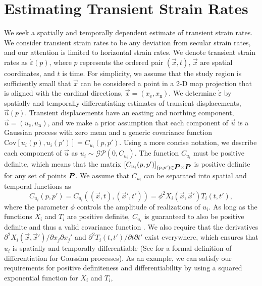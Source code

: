 \documentclass[extra,mreferee]{gji}
\begin{document}
\section{Estimating Transient Strain Rates}\label{sec:Method}
We seek a spatially and temporally dependent estimate of transient strain rates. We consider transient strain rates to be any deviation from secular strain rates, and our attention is limited to horizontal strain rates. We denote transient strain rates as $\dot\varepsilon(p)$, where $p$ represents the ordered pair $(\vec{x},t)$, $\vec{x}$ are spatial coordinates, and $t$ is time. For simplicity, we assume that the study region is sufficiently small that $\vec{x}$ can be considered a point in a 2-D map projection that is aligned with the cardinal directions, $\vec{x} = (x_\mathrm{e},x_\mathrm{n})$. We determine $\dot\varepsilon$ by spatially and temporally differentiating estimates of transient displacements, $\vec{u}(p)$. Transient displacements have an easting and northing component, $\vec{u} = (u_\mathrm{e}, u_\mathrm{n})$, and we make a prior assumption that each component of $\vec{u}$ is a Gaussian process with zero mean and a generic covariance function $\mathrm{Cov}\left[u_i(p),u_i(p')\right] = C_{u_i}(p,p')$. Using a more concise notation, we describe each component of $\vec{u}$ as $u_i \sim \mathcal{GP}\left(0,C_{u_i}\right)$. The function $C_{u_i}$ must be positive definite, which means that the matrix $[C_{u_i}(p,p')]_{(p,p') \in \mitbf{P} \times \mitbf{P}}$ is positive definite for any set of points $\mitbf{P}$. We assume that $C_{u_i}$ can be separated into spatial and temporal functions as 
\begin{equation}\label{eq:TransientCovariance}
C_{u_i}(p,p') = C_{u_i}\left((\vec{x},t),(\vec{x}',t')\right) = \phi^2 X_i(\vec{x},\vec{x}')T_i(t,t'),
\end{equation}   
where the parameter $\phi$ controls the amplitude of realizations of $u_i$. As long as the functions $X_i$ and $T_i$ are positive definite, $C_{u_i}$ is guaranteed to also be positive definite and thus a valid covariance function \citep[sec. 4.2.4]{Rasmussen2006}. We also require that the derivatives $\partial^2 X_i(\vec{x},\vec{x}')/ \partial x_j \partial x_j'$ and $\partial^2 T_i(t,t') / \partial t \partial t'$ exist everywhere, which ensures that $u_i$ is spatially and temporally differentiable (See \citet[sec. 2.2]{Adler1981} for a formal definition of differentiation for Gaussian processes). As an example, we can satisfy our requirements for positive definiteness and differentiability by using a squared exponential function for $X_i$ and $T_i$,
\end{document}
